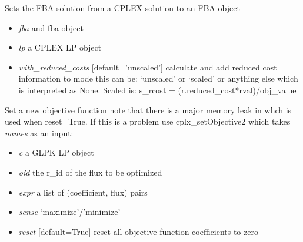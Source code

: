 \documentclass[a4paper,11pt,english]{sphinxmanual}
\begin{document}
\begin{fulllineitems}
\label{modules_doc:cbmpy.CBGLPK.glpk_setFBAsolutionToModel}
Sets the FBA solution from a CPLEX solution to an FBA object
\begin{itemize}
\item {} 
\emph{fba} and fba object

\item {} 
\emph{lp} a CPLEX LP object

\item {} 
\emph{with\_reduced\_costs} {[}default='unscaled'{]} calculate and add reduced cost information to mode this can be: `unscaled' or `scaled'
or anything else which is interpreted as None. Scaled is: s\_rcost = (r.reduced\_cost*rval)/obj\_value

\end{itemize}

\end{fulllineitems}


\begin{fulllineitems}
\label{modules_doc:cbmpy.CBGLPK.glpk_setObjective}
Set a new objective function note that there is a major memory leak in
 whch is used when reset=True. If this is a problem
use cplx\_setObjective2 which takes \emph{names} as an input:
\begin{itemize}
\item {} 
\emph{c} a GLPK LP object

\item {} 
\emph{oid} the r\_id of the flux to be optimized

\item {} 
\emph{expr} a list of (coefficient, flux) pairs

\item {} 
\emph{sense} `maximize'/'minimize'

\item {} 
\emph{reset} {[}default=True{]} reset all objective function coefficients to zero

\end{itemize}

\end{fulllineitems}
\end{document}
